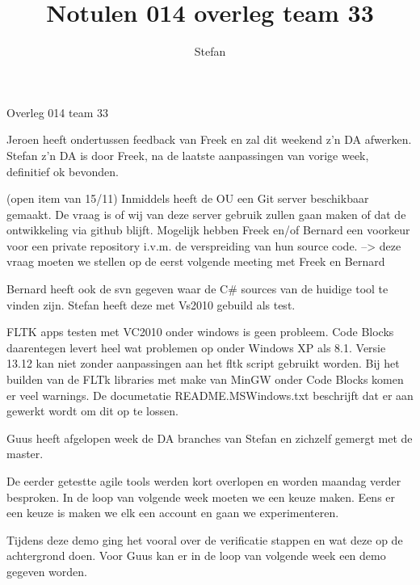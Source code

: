 \documentclass{article}
\title{Notulen 014 overleg team 33}
\author{Stefan}
\begin{document}

\begin{Minutes}{Overleg 014 team 33}

\maketitle%


Jeroen heeft ondertussen feedback van Freek en zal dit weekend z'n DA afwerken.
Stefan z'n DA is door Freek, na de laatste aanpassingen van vorige week, definitief ok bevonden.

(open item van 15/11)
Inmiddels heeft de OU een Git server beschikbaar gemaakt. De vraag is of wij van
deze server gebruik zullen gaan maken of dat de ontwikkeling via github blijft.
Mogelijk hebben Freek en/of Bernard een voorkeur voor een private repository i.v.m.
de verspreiding van hun source code.
--> deze vraag moeten we stellen op de eerst volgende meeting met Freek en Bernard

Bernard heeft ook de svn gegeven waar de C\# sources van de huidige tool te vinden
zijn. Stefan heeft deze met Vs2010 gebuild als test. 


FLTK apps testen met VC2010 onder windows is geen probleem. 
Code Blocks daarentegen levert heel wat problemen op onder Windows XP als 8.1. 
Versie 13.12 kan niet zonder aanpassingen aan het fltk script gebruikt worden.
Bij het builden van de FLTk libraries met make van MinGW onder Code Blocks komen
er veel warnings. De documetatie README.MSWindows.txt beschrijft dat er aan
gewerkt wordt om dit op te lossen.



Guus heeft afgelopen week de DA branches van Stefan en zichzelf gemergt met de master.


De eerder getestte agile tools werden kort overlopen en worden maandag verder besproken.  
In de loop van volgende week moeten we een keuze maken. Eens er een keuze is
maken we elk een account en gaan we experimenteren.


Tijdens deze demo ging het
vooral over de verificatie stappen en wat deze op de achtergrond doen.
Voor Guus kan er in de loop van volgende week een demo gegeven worden.


\end{Minutes}
\end{document}
